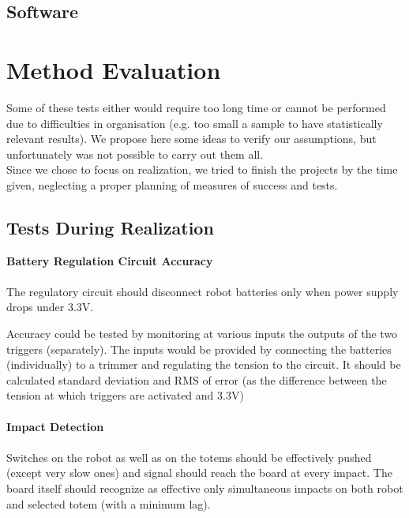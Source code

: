\documentclass[a4paper,twoside]{book}
\newcommand{\includeDir}{include}
\begin{document}
\section{Software}
\label{sec:software}


\chapter{Method Evaluation}

Some of these tests either would require too long time or cannot be performed due to difficulties in organisation (e.g. too small a sample to have statistically relevant results). We propose here some ideas to verify our assumptions, but unfortunately was not possible to carry out them all.
\\
Since we chose to focus on realization, we tried to finish the projects by the time given, neglecting a proper planning of measures of success and tests.

\section{Tests During Realization}

\textbf{Battery Regulation Circuit Accuracy}
\\
\\
The regulatory circuit should disconnect robot batteries only when power supply drops under 3.3V.

Accuracy could be tested by monitoring at various inputs the outputs of the two triggers (separately). The inputs would be provided by connecting the batteries (individually) to a trimmer and regulating the tension to the circuit. It should be calculated standard deviation and RMS of error (as the difference between the tension at which triggers are activated and 3.3V)
\\
\\
\textbf{Impact Detection}
\\
\\
Switches on the robot as well as on the totems should be effectively pushed (except very slow ones) and signal should reach the board at every impact.
The board itself should recognize as effective only simultaneous impacts on both robot and selected totem (with a minimum lag).
\end{document}
